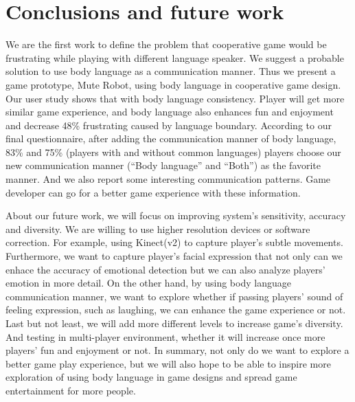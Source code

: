 \section{Conclusions and future work}



We are the first work to define the problem that cooperative game would be frustrating while playing with different language speaker. We suggest a probable solution to use body language as a communication manner. Thus we present a game prototype, Mute Robot, using body language in cooperative game design. Our user study shows that with body language consistency. Player will get more similar game experience, and body language also enhances fun and enjoyment and decrease 48\% frustrating caused by language boundary. According to our final questionnaire, 
after adding the communication manner of body language, 83\% and 75\% (players with and without common languages) players choose our new communication manner (``Body language'' and ``Both'') as the favorite manner. 
And we also report some interesting communication patterns. Game developer can go for a better game experience with these information.

About our future work, we will focus on improving system's sensitivity, accuracy and diversity. We are willing to use higher resolution devices or software correction. For example, using Kinect(v2) to capture player's subtle movements. Furthermore, we want to capture player's facial expression that not only can we enhace the accuracy of emotional detection but we can also analyze players' emotion in more detail.
On the other hand, by using body language communication manner, we want to explore whether if passing players' sound of feeling expression, such as laughing, we can enhance the game experience or not. Last but not least, we will add more different levels to increase game's diversity. And testing in multi-player environment, whether it will increase once more players' fun and enjoyment or not. In summary, not only do we want to explore a better game play experience, but we will also hope to be able to inspire more exploration of using body language in game designs and spread game entertainment for more people.


